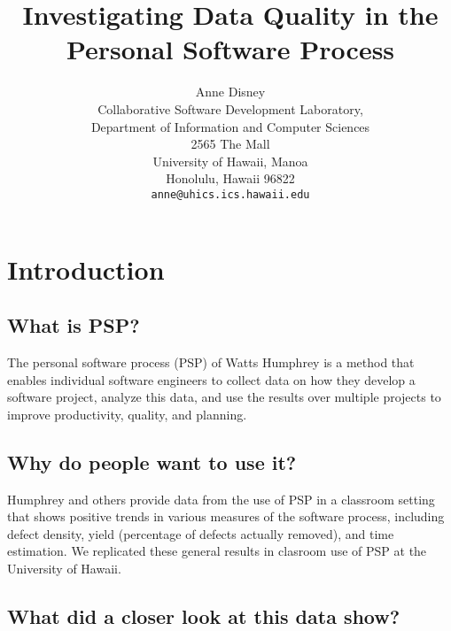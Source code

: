 



\title{Investigating Data Quality in the Personal Software Process}
\author{Anne Disney\\
Collaborative Software Development Laboratory,\\
Department of Information and Computer Sciences\\
2565 The Mall\\
University of Hawaii, Manoa\\
Honolulu, Hawaii   96822\\
{\tt anne@uhics.ics.hawaii.edu}}
\maketitle

\setlength{\parindent}{0em}
\setlength{\parskip}{1ex}

\tableofcontents
\chapter{Introduction}
\section{What is PSP?}

The personal software process (PSP) of Watts Humphrey is
a method that enables individual software engineers to
collect data on how they develop a software project,
analyze this data, and use the results over multiple projects
to improve productivity, quality, and planning.

\section{Why do people want to use it?}

Humphrey and others provide data from the use of PSP in a
classroom setting that shows positive trends in various measures
of the software process, including defect density, yield
(percentage of defects actually removed), and time estimation.
We replicated these general results in clasroom use of PSP at the
University of Hawaii.

\section{What did a closer look at this data show?}

